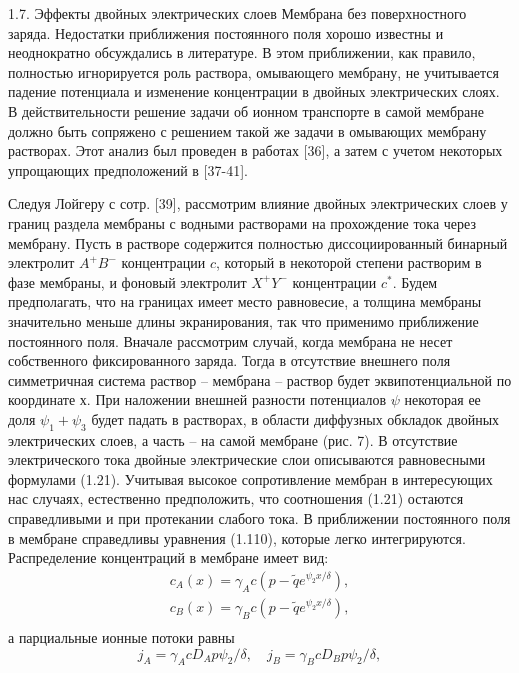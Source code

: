 1.7. Эффекты двойных электрических слоев
Мембрана без поверхностного заряда. Недостатки приближения постоянного поля
хорошо известны и неоднократно обсуждались в литературе. В этом приближении,
как правило, полностью
игнорируется роль раствора, омывающего мембрану, не учитывается падение
потенциала и изменение концентрации в двойных электрических слоях. В
действительности решение задачи об ионном транспорте в самой мембране должно
быть сопряжено с решением такой же задачи в омывающих мембрану растворах.
Этот анализ был проведен в работах [36], а затем с учетом некоторых упрощающих
предположений в [37-41].

Следуя Лойгеру с сотр. [39], рассмотрим влияние двойных электрических слоев у
границ раздела мембраны с водными растворами на прохождение тока через мембрану.
Пусть в растворе содержится полностью диссоциированный бинарный электролит
\( A^+B^- \) концентрации \( c \), который в некоторой степени растворим в фазе
мембраны, и фоновый электролит \( X^+Y^- \) концентрации \( c^* \). Будем
предполагать, что на границах имеет место равновесие, а толщина мембраны
значительно меньше длины экранирования, так что применимо приближение
постоянного поля. Вначале рассмотрим случай, когда мембрана не несет
собственного фиксированного заряда. Тогда в отсутствие внешнего поля
симметричная система раствор -- мембрана -- раствор будет эквипотенциальной по
координате х. При наложении внешней разности потенциалов \( \psi \) некоторая ее
доля \( \psi_1 + \psi_3 \) будет падать в растворах, в области диффузных
обкладок двойных электрических слоев, а часть -- на самой мембране (рис. 7). В
отсутствие электрического тока двойные электрические слои описываются
равновесными формулами (1.21). Учитывая высокое сопротивление мембран в
интересующих нас случаях, естественно предположить, что соотношения (1.21)
остаются справедливыми и при протекании слабого тока. В приближении постоянного
поля в мембране справедливы уравнения (1.110), которые легко интегрируются.
Распределение концентраций в мембране имеет вид:
\begin{equation}
    \begin{array}{l}
        c_A(x) = \gamma_A c(p-\tilde{q}e^{\psi_2x/\delta}),\\
        c_B(x) = \gamma_B c(p-\tilde{q}e^{\psi_2x/\delta}),\\
    \end{array}
\end{equation}
а парциальные ионные потоки равны
\begin{equation}
    j_A = \gamma_A c D_A p\psi_2/\delta,\quad
    j_B = \gamma_B c D_B p\psi_2/\delta,
\end{equation}
